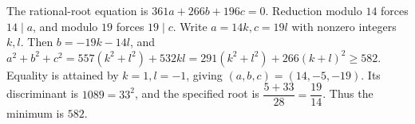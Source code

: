 The rational-root equation is $361a+266b+196c=0$. Reduction modulo $14$ forces $14\mid a$, and modulo $19$ forces $19\mid c$. Write $a=14k,c=19l$ with nonzero integers $k,l$. Then $b=-19k-14l$, and $a^2+b^2+c^2=557(k^2+l^2)+532kl=291(k^2+l^2)+266(k+l)^2\ge582$. Equality is attained by $k=1,l=-1$, giving $(a,b,c)=(14,-5,-19)$. Its discriminant is $1089=33^2$, and the specified root is $\dfrac{5+33}{28}=\dfrac{19}{14}$. Thus the minimum is $\boxed{582}$.
